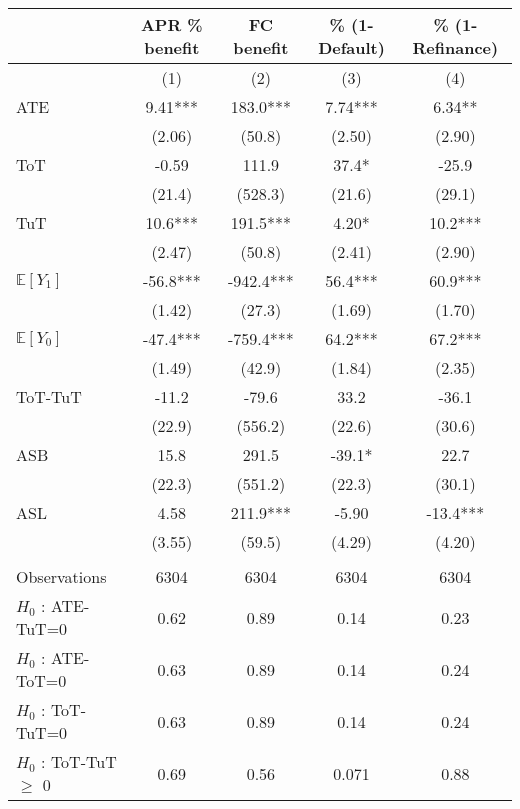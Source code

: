 \begin{tabular}{lcccc}
\toprule
      & APR \% benefit & FC benefit & \% (1-Default) & \% (1-Refinance) \\
\midrule
      & (1)   & (2)   & (3)   & (4) \\
\midrule
\midrule
ATE   & 9.41*** & 183.0*** & 7.74*** & 6.34** \\
      & (2.06) & (50.8) & (2.50) & (2.90) \\
ToT   & -0.59 & 111.9 & 37.4* & -25.9 \\
      & (21.4) & (528.3) & (21.6) & (29.1) \\
TuT   & 10.6*** & 191.5*** & 4.20* & 10.2*** \\
      & (2.47) & (50.8) & (2.41) & (2.90) \\
$\mathbb{E}[Y_1]$ & -56.8*** & -942.4*** & 56.4*** & 60.9*** \\
      & (1.42) & (27.3) & (1.69) & (1.70) \\
$\mathbb{E}[Y_0]$ & -47.4*** & -759.4*** & 64.2*** & 67.2*** \\
      & (1.49) & (42.9) & (1.84) & (2.35) \\
\midrule
ToT-TuT & -11.2 & -79.6 & 33.2  & -36.1 \\
      & (22.9) & (556.2) & (22.6) & (30.6) \\
ASB   & 15.8  & 291.5 & -39.1* & 22.7 \\
      & (22.3) & (551.2) & (22.3) & (30.1) \\
ASL   & 4.58  & 211.9*** & -5.90 & -13.4*** \\
      & (3.55) & (59.5) & (4.29) & (4.20) \\
      &       &       &       &  \\
\midrule
Observations & 6304  & 6304  & 6304  & 6304 \\
$H_0$ : ATE-TuT=0 & 0.62  & 0.89  & 0.14  & 0.23 \\
$H_0$ : ATE-ToT=0 & 0.63  & 0.89  & 0.14  & 0.24 \\
$H_0$ : ToT-TuT=0 & 0.63  & 0.89  & 0.14  & 0.24 \\
$H_0$ : ToT-TuT$\geq$ 0 & 0.69  & 0.56  & 0.071 & 0.88 \\
\bottomrule
\bottomrule
\end{tabular}%
